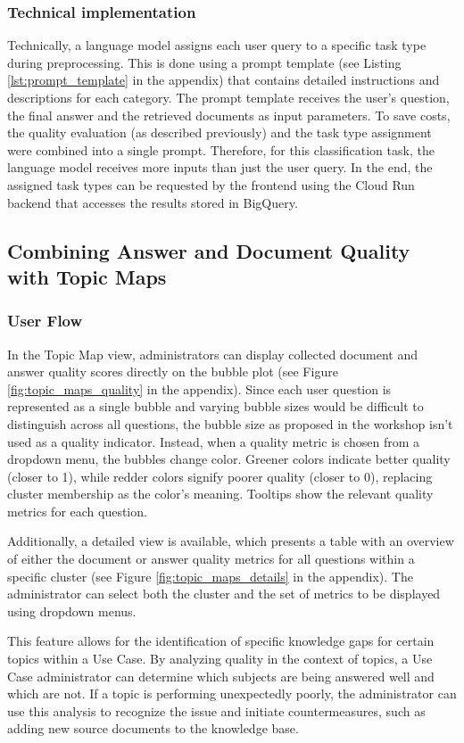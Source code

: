 \documentclass[
	english,
	ruledheaders=section,%
	class=report,%
	thesis={type=bachelor},%
	accentcolor=1b,%
	custommargins=true,%
	marginpar=false,%
	parskip=half-,%
	fontsize=11pt,%
	DIV=14,
]{tudapub}
\begin{document}
\subsubsection{Technical implementation}
Technically, a language model assigns each user query to a specific task type during preprocessing. This is done using a prompt template (see Listing \ref{lst:prompt_template} in the appendix) that contains detailed instructions and descriptions for each category. The prompt template receives the user's question, the final answer and the retrieved documents as input parameters. To save costs, the quality evaluation (as described previously) and the task type assignment were combined into a single prompt. Therefore, for this classification task, the language model receives more inputs than just the user query. In the end, the assigned task types can be requested by the frontend using the Cloud Run backend that accesses the results stored in BigQuery.
\subsection{Combining Answer and Document Quality with Topic Maps}
\subsubsection{User Flow}
In the Topic Map view, administrators can display collected document and answer quality scores directly on the bubble plot (see Figure \ref{fig:topic_maps_quality} in the appendix). Since each user question is represented as a single bubble and varying bubble sizes would be difficult to distinguish across all questions, the bubble size as proposed in the workshop isn't used as a quality indicator. Instead, when a quality metric is chosen from a dropdown menu, the bubbles change color. Greener colors indicate better quality (closer to 1), while redder colors signify poorer quality (closer to 0), replacing cluster membership as the color's meaning. Tooltips show the relevant quality metrics for each question.

Additionally, a detailed view is available, which presents a table with an overview of either the document or answer quality metrics for all questions within a specific cluster (see Figure  \ref{fig:topic_maps_details} in the appendix). The administrator can select both the cluster and the set of metrics to be displayed using dropdown menus.

This feature allows for the identification of specific knowledge gaps for certain topics within a Use Case. By analyzing quality in the context of topics, a Use Case administrator can determine which subjects are being answered well and which are not. If a topic is performing unexpectedly poorly, the administrator can use this analysis to recognize the issue and initiate countermeasures, such as adding new source documents to the knowledge base.
\end{document}
